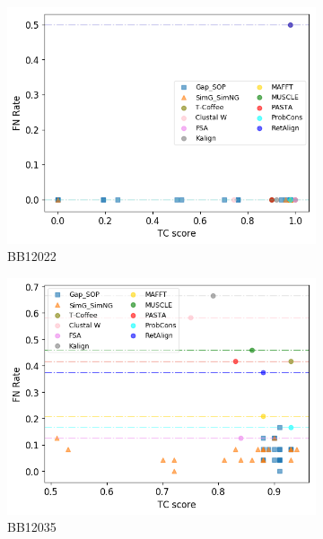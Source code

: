 \begin{figure}[!htbp]
\begin{adjustwidth}{-1cm}{-1cm}
		\begin{subfigure}{0.22\textwidth}
			\includegraphics[width=\columnwidth]{Figure/summary/precomputedInit/Balibase/BB12022_fnrate_vs_tc_2}
			\caption{BB12022}
		\end{subfigure}
		\begin{subfigure}{0.22\textwidth}
			\includegraphics[width=\columnwidth]{Figure/summary/precomputedInit/Balibase/BB12035_fnrate_vs_tc_2}
			\caption{BB12035}
		\end{subfigure}	
		\begin{subfigure}{0.22\textwidth}

\end{subfigure}
\end{adjustwidth}
\end{figure}
